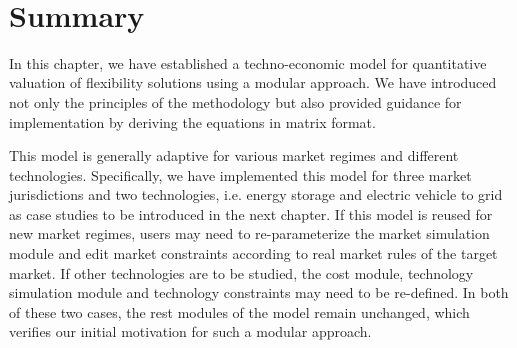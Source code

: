 

~\newpage
\section{Summary}
In this chapter, we have established a techno-economic model for quantitative valuation of flexibility solutions using a modular approach. We have introduced not only the principles of the methodology but also provided guidance for implementation by deriving the equations in matrix format.

This model is generally adaptive for various market regimes and different technologies. Specifically, we have implemented this model for three market jurisdictions and two technologies, i.e. energy storage and electric vehicle to grid as case studies to be introduced in the next chapter. If this model is reused for new market regimes, users may need to re-parameterize the market simulation module and edit market constraints according to real market rules of the target market. If other technologies are to be studied, the cost module, technology simulation module and technology constraints may need to be re-defined. In both of these two cases, the rest modules of the model remain unchanged, which verifies our initial motivation for such a modular approach.
%
